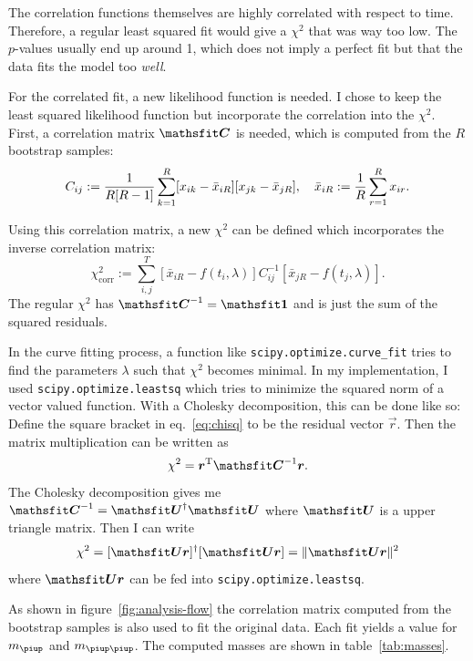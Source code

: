 \documentclass[11pt, english, fleqn, DIV=15, headinclude]{scrartcl}
\newcommand\mpi{m_{\piup}}
\newcommand\mpipi{m_{\piup\piup}}
\begin{document}
The correlation functions themselves are highly correlated with respect to
time. Therefore, a regular least squared fit would give a $\chi^2$ that was way
too low. The $p$-values usually end up around 1, which does not imply a perfect
fit but that the data fits the model too \emph{well}.

For the correlated fit, a new likelihood function is needed. I chose to keep
the least squared likelihood function but incorporate the correlation into the
$\chi^2$. First, a correlation matrix $\tens C$ is needed, which is computed
from the $R$ bootstrap samples:
\begin{equation}
    \label{eq:correlation_matrix}
    C_{ij} := \frac{1}{R[R-1]} \sum_{k=1}^R
    [x_{ik} - \bar x_{iR}] [x_{jk} - \bar x_{jR}]
    ,\quad
    \bar x_{iR} := \frac 1R \sum_{r=1}^R x_{ir}.
\end{equation}

Using this correlation matrix, a new $\chi^2$ can be defined which incorporates
the inverse correlation matrix:
\begin{equation}
    \label{eq:chisq}
    \chi^2_\text{corr} := \sum_{i, j}^T
    \left[ \bar x_{iR} - f(t_i, \lambda) \right]
    C^{-1}_{ij}
    \left[ \bar x_{jR} - f(t_j, \lambda) \right].
\end{equation}
The regular $\chi^2$ has $\tens C^{-1} = \tens 1$ and is just the sum of the
squared residuals.

In the curve fitting process, a function like
\texttt{scipy.optimize.curve\_fit} tries to find the parameters $\lambda$ such
that $\chi^2$ becomes minimal. In my implementation, I used
\texttt{scipy.optimize.leastsq} which tries to minimize the squared norm of a
vector valued function. With a Cholesky decomposition, this can be done like
so: Define the square bracket in eq.~\eqref{eq:chisq} to be the residual vector
$\vec r$. Then the matrix multiplication can be written as
\begin{equation}
    \chi^2 = \vec r^\text T \tens C^{-1} \vec r.
\end{equation}
The Cholesky decomposition gives me $\tens C^{-1} = \tens U^\dagger \tens U$
where $\tens U$ is a upper triangle matrix. Then I can write
\begin{equation}
    \chi^2 = [\tens U \vec r]^\dagger [\tens U \vec r]
    = \| \tens U \vec r \|^2
\end{equation}
where $\tens U \vec r$ can be fed into \texttt{scipy.optimize.leastsq}.

As shown in figure~\ref{fig:analysis-flow} the correlation matrix computed from
the bootstrap samples is also used to fit the original data. Each fit yields a
value for $\mpi$ and $\mpipi$. The computed masses are shown in
table~\ref{tab:masses}.
\end{document}

